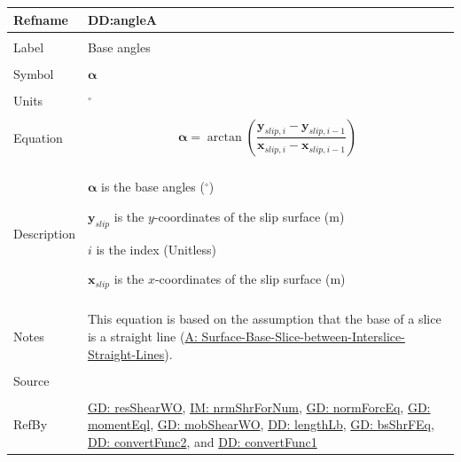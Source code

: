 \documentclass[12pt]{article}
\begin{document}
\vspace{\baselineskip}
\noindent
\begin{minipage}{\textwidth}
\begin{tabular}{>{\raggedright}p{}>{\raggedright\arraybackslash}p{}}
\toprule \textbf{Refname} & \textbf{DD:angleA}
\label{DD:angleA}
\\ \midrule \\
Label & Base angles
        
\\ \midrule \\
Symbol & $\mathbf{α}$
         
\\ \midrule \\
Units & ${}^{\circ}$
        
\\ \midrule \\
Equation & \begin{displaymath}
           \mathbf{α}=\arctan\left(\frac{{\mathbf{y}_{slip,i}}-{\mathbf{y}_{slip,i-1}}}{{\mathbf{x}_{slip,i}}-{\mathbf{x}_{slip,i-1}}}\right)
           \end{displaymath}
\\ \midrule \\
Description & \begin{symbDescription}
              \item{$\mathbf{α}$ is the base angles (${}^{\circ}$)}
              \item{${\mathbf{y}_{slip}}$ is the $y$-coordinates of the slip surface (m)}
              \item{$i$ is the index (Unitless)}
              \item{${\mathbf{x}_{slip}}$ is the $x$-coordinates of the slip surface (m)}
              \end{symbDescription}
\\ \midrule \\
Notes & This equation is based on the assumption that the base of a slice is a straight line (\hyperref[assumpSBSBISL]{A: Surface-Base-Slice-between-Interslice-Straight-Lines}).
        
\\ \midrule \\
Source & \cite{fredlund1977}
         
\\ \midrule \\
RefBy & \hyperref[GD:resShearWO]{GD: resShearWO}, \hyperref[IM:nrmShrForNum]{IM: nrmShrForNum}, \hyperref[GD:normForcEq]{GD: normForcEq}, \hyperref[GD:momentEql]{GD: momentEql}, \hyperref[GD:mobShearWO]{GD: mobShearWO}, \hyperref[DD:lengthLb]{DD: lengthLb}, \hyperref[GD:bsShrFEq]{GD: bsShrFEq}, \hyperref[DD:convertFunc2]{DD: convertFunc2}, and \hyperref[DD:convertFunc1]{DD: convertFunc1}
        
\\ \bottomrule
\end{tabular}
\end{minipage}
\end{document}
